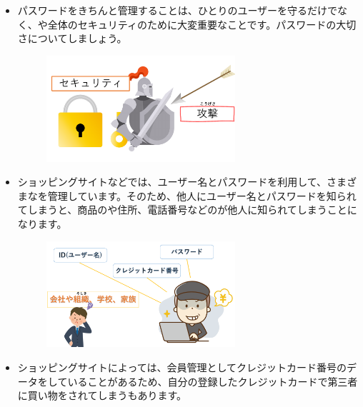\documentclass[a4paper,12pt]{jarticle}
\begin{document}
\begin{enumerate}
\clearpage
          \begin{itemize}
          \item
            パスワードをきちんと管理することは、ひとりのユーザーを守るだけでなく、や全体のセキュリティのために大変重要なことです。パスワードの大切さについてしましょう。
          \begin{figure}[h]
          \centering
          \begin{minipage}{5.228cm}
            {\upshape
              \includegraphics[width=7.000cm]{pswd_image_imp7.pdf}
              }
          \end{minipage}
          \end{figure}
          \item
          ショッピングサイトなどでは、ユーザー名とパスワードを利用して、さまざまなを管理しています。そのため、他人にユーザー名とパスワードを知られてしまうと、商品のや住所、電話番号などのが他人に知られてしまうことになります。
          \begin{figure}[h]
          \centering
          \begin{minipage}{5.228cm}
            {\upshape
              \includegraphics[width=7.000cm]{pswd_image_imp2.pdf}
              }
          \end{minipage}
          \end{figure}
          \item
          ショッピングサイトによっては、会員管理としてクレジットカード番号のデータをしていることがあるため、自分の登録したクレジットカードで第三者に買い物をされてしまうもあります。

\end{itemize}
\end{enumerate}
\end{document}
